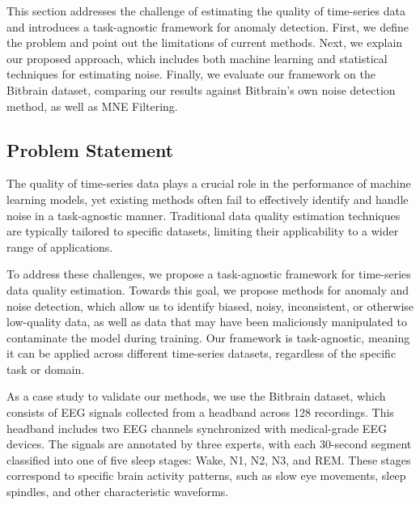 
This section addresses the challenge of estimating the quality of time-series data and introduces a task-agnostic framework for anomaly detection. First, we define the problem and point out the limitations of current methods. Next, we explain our proposed approach, which includes both machine learning and statistical techniques for estimating noise. Finally, we evaluate our framework on the Bitbrain dataset, comparing our results against Bitbrain's own noise detection method, as well as MNE Filtering.

\subsection{Problem Statement}

The quality of time-series data plays a crucial role in the performance of machine learning models, yet existing methods often fail to effectively identify and handle noise in a task-agnostic manner. Traditional data quality estimation techniques are typically tailored to specific datasets, limiting their applicability to a wider range of applications. 

To address these challenges, we propose a task-agnostic framework for time-series data quality estimation. Towards this goal, we propose methods for anomaly and noise detection, which allow us to identify biased, noisy, inconsistent, or otherwise low-quality data, as well as data that may have been maliciously manipulated to contaminate the model during training. Our framework is task-agnostic, meaning it can be applied across different time-series datasets, regardless of the specific task or domain.

As a case study to validate our methods, we use the Bitbrain dataset, which consists of EEG signals collected from a headband across 128 recordings. This headband includes two EEG channels synchronized with medical-grade EEG devices. The signals are annotated by three experts, with each 30-second segment classified into one of five sleep stages: Wake, N1, N2, N3, and REM. These stages correspond to specific brain activity patterns, such as slow eye movements, sleep spindles, and other characteristic waveforms.


